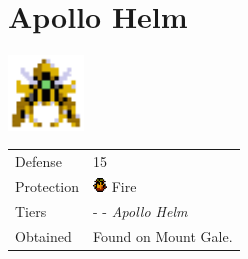 \section{Apollo Helm}
\label{armor:apollo_helm}

\includegraphics[height=2cm,keepaspectratio]{./resources/armors/apollohelm}

\begin{longtable}{ l p{9cm} }
	Defense
	& 15
\\ %
	Protection
	& \includegraphics[height=1em,keepaspectratio]{./resources/effects/fire}
	Fire
\\ %
	Tiers
	& \nameref{armor:steel_helm} - \nameref{armor:moon_helm} - \textit{Apollo Helm}
\\ %
	Obtained
	& Found on Mount Gale.
\end{longtable}
